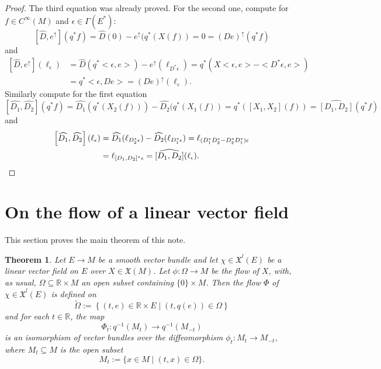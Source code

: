 \documentclass{amsart}
\theoremstyle{plain}
\newtheorem{theorem}{Theorem}[section]
\newcommand{\R}{\mathbb{R}}
\newcommand{\inv}{^{-1}}
\newcommand{\mx}{\mathfrak{X}}
\begin{document}
\begin{proof}
The third equation was already proved. For the second one, compute for $f\in C^\infty(M)$ and $\epsilon\in\Gamma(E^*)$:
\[\left[\widehat{D}, e^\uparrow\right](q^* f)=\widehat{D}(0)-e^\uparrow(q^*(X(f))=0=(De)^\uparrow(q^*f)
\]
and 
\begin{equation*}
\begin{split}\left[\widehat{D}, e^\uparrow\right](\ell_\epsilon)&=\widehat{D}(q^*<\epsilon, e>)-e^\uparrow(\ell_{D^*\epsilon})=q^*(X<\epsilon, e>-<D^*\epsilon, e>)\\
&=q^*<\epsilon, De>=(De)^\uparrow(\ell_\epsilon).
\end{split}
\end{equation*}
Similarly compute for the first equation
\[\left[\widehat{D_1}, \widehat{D_2}\right](q^* f)=\widehat{D_1}(q^*(X_2(f)))-\widehat{D_2}(q^*(X_1(f))=q^*([X_1,X_2](f))=\widehat{\left[D_1, D_2\right]}(q^*f)
\]
and 
\begin{equation*}
\begin{split}
\left[\widehat{D_1}, \widehat{D_2}\right](\ell_\epsilon)&=\widehat{D_1}(\ell_{D_2^*\epsilon})-\widehat{D_2}(\ell_{D_1 ^*\epsilon})=\ell_{(D_1^*D_2^*-D_2^*D_1^*)\epsilon}
\\
&=\ell_{[D_1,D_2]^*\epsilon}=\widehat{[D_1,D_2]}(\ell_\epsilon).\qedhere
\end{split}
\end{equation*}
\end{proof}


\bigskip





\section{On the flow of a linear vector field}\label{Section_linear_flows}

This section proves the main theorem of this note.
\begin{theorem}\label{lemma_linear_flow}
Let $E\to M$ be a smooth vector bundle and let $\chi\in\mx^l(E)$ be a linear vector field on $E$ over $X\in\mx(M)$. Let $\phi\colon \Omega\to M$ be the flow of $X$, with, as usual, $\Omega\subseteq \R\times M$ an open subset containing $\{0\}\times M$. Then the flow $\Phi$ of $\chi\in\mx^l(E)$ is defined on 
\[ \widetilde\Omega:=\left\{ (t, e)\in \R\times E \mid (t,q(e))\in \Omega
\right\}
\]
and for each $t\in\R$, the map
\[ \Phi_t\colon q\inv(M_t)\to q\inv(M_{-t})
\]
is an isomorphism of vector bundles over the diffeomorphism $\phi_t\colon M_t\to M_{-t}$, where 
$M_t\subseteq M$ is the open subset
\[ M_t:=\{x\in M\mid (t,x)\in\Omega\}.
\]
\end{theorem}
\end{document}
